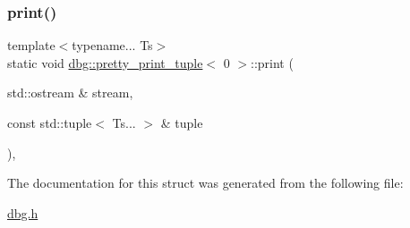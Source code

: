 \subsubsection{\texorpdfstring{print()}{print()}}
{\footnotesize\ttfamily template$<$typename... Ts$>$ \\
static void \hyperlink{structdbg_1_1pretty__print__tuple}{dbg\+::pretty\+\_\+print\+\_\+tuple}$<$ 0 $>$\+::print (\begin{DoxyParamCaption}\item[{std\+::ostream \&}]{stream,  }\item[{const std\+::tuple$<$ Ts... $>$ \&}]{tuple }\end{DoxyParamCaption})\hspace{0.3cm}{\ttfamily [inline]}, {\ttfamily [static]}}



The documentation for this struct was generated from the following file\+:\begin{DoxyCompactItemize}
\item 
\hyperlink{dbg_8h}{dbg.\+h}\end{DoxyCompactItemize}
